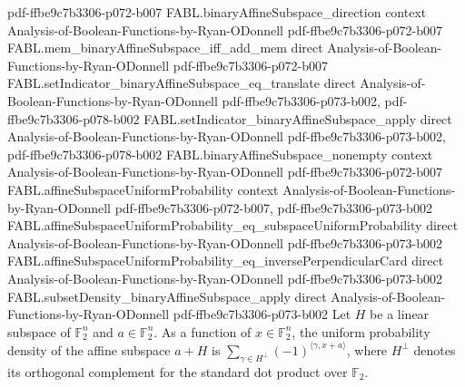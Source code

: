 \begin{theorem}
  {pdf-ffbe9c7b3306-p072-b007}
\proofstep
  {FABL.binaryAffineSubspace_direction}
  {context}
  {Analysis-of-Boolean-Functions-by-Ryan-ODonnell}
  {pdf-ffbe9c7b3306-p072-b007}
\proofstep
  {FABL.mem_binaryAffineSubspace_iff_add_mem}
  {direct}
  {Analysis-of-Boolean-Functions-by-Ryan-ODonnell}
  {pdf-ffbe9c7b3306-p072-b007}
\proofstep
  {FABL.setIndicator_binaryAffineSubspace_eq_translate}
  {direct}
  {Analysis-of-Boolean-Functions-by-Ryan-ODonnell}
  {pdf-ffbe9c7b3306-p073-b002,
    pdf-ffbe9c7b3306-p078-b002}
\proofstep
  {FABL.setIndicator_binaryAffineSubspace_apply}
  {direct}
  {Analysis-of-Boolean-Functions-by-Ryan-ODonnell}
  {pdf-ffbe9c7b3306-p073-b002,
    pdf-ffbe9c7b3306-p078-b002}
\proofstep
  {FABL.binaryAffineSubspace_nonempty}
  {context}
  {Analysis-of-Boolean-Functions-by-Ryan-ODonnell}
  {pdf-ffbe9c7b3306-p072-b007}
\proofstep
  {FABL.affineSubspaceUniformProbability}
  {context}
  {Analysis-of-Boolean-Functions-by-Ryan-ODonnell}
  {pdf-ffbe9c7b3306-p072-b007,
    pdf-ffbe9c7b3306-p073-b002}
\proofstep
  {FABL.affineSubspaceUniformProbability_eq_subspaceUniformProbability}
  {direct}
  {Analysis-of-Boolean-Functions-by-Ryan-ODonnell}
  {pdf-ffbe9c7b3306-p073-b002}
\proofstep
  {FABL.affineSubspaceUniformProbability_eq_inversePerpendicularCard}
  {direct}
  {Analysis-of-Boolean-Functions-by-Ryan-ODonnell}
  {pdf-ffbe9c7b3306-p073-b002}
\proofstep
  {FABL.subsetDensity_binaryAffineSubspace_apply}
  {direct}
  {Analysis-of-Boolean-Functions-by-Ryan-ODonnell}
  {pdf-ffbe9c7b3306-p073-b002}
Let $H$ be a linear subspace of $\mathbb{F}_2^n$ and $a\in\mathbb{F}_2^n$. As a function
of $x\in\mathbb{F}_2^n$, the uniform probability density of the affine subspace $a+H$ is
$\sum_{\gamma\in H^\perp}(-1)^{\langle\gamma,x+a\rangle}$, where $H^\perp$ denotes its
orthogonal complement for the standard dot product over $\mathbb{F}_2$.
\end{theorem}


